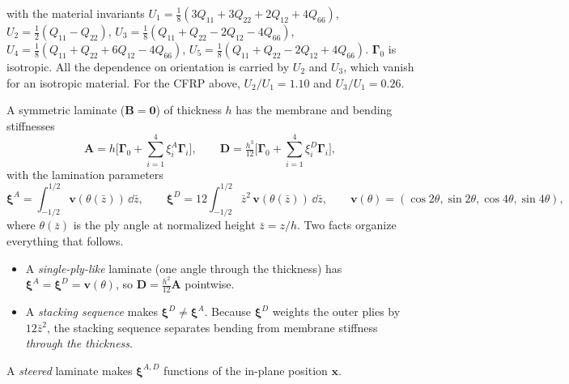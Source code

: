 with the material invariants
$U_1=\tfrac18(3Q_{11}+3Q_{22}+2Q_{12}+4Q_{66})$, $U_2=\tfrac12(Q_{11}-Q_{22})$,
$U_3=\tfrac18(Q_{11}+Q_{22}-2Q_{12}-4Q_{66})$, $U_4=\tfrac18(Q_{11}+Q_{22}+6Q_{12}-4Q_{66})$,
$U_5=\tfrac18(Q_{11}+Q_{22}-2Q_{12}+4Q_{66})$. $\bm\Gamma_0$ is isotropic. All the
dependence on orientation is carried by $U_2$ and $U_3$, which vanish for an isotropic
material. For the CFRP above, $U_2/U_1=1.10$ and $U_3/U_1=0.26$.

A symmetric laminate ($\bm B=\bm 0$) of thickness $h$ has the membrane and bending
stiffnesses
\begin{equation}
\bm A=h\Big[\bm\Gamma_0+\textstyle\sum_{i=1}^4\xi^A_i\bm\Gamma_i\Big],\qquad
\bm D=\tfrac{h^3}{12}\Big[\bm\Gamma_0+\textstyle\sum_{i=1}^4\xi^D_i\bm\Gamma_i\Big],
\label{eq:lampar}
\end{equation}
with the lamination parameters \cite{tsai1968,abdalla2007}
\begin{equation}
\bm\xi^A=\int_{-1/2}^{1/2}\bm v(\theta(\bar z))\,\dd\bar z,\qquad
\bm\xi^D=12\int_{-1/2}^{1/2}\bar z^2\,\bm v(\theta(\bar z))\,\dd\bar z,\qquad
\bm v(\theta)=(\cos2\theta,\sin2\theta,\cos4\theta,\sin4\theta),
\label{eq:xi}
\end{equation}
where $\theta(\bar z)$ is the ply angle at normalized height $\bar z=z/h$. Two facts
organize everything that follows.
\begin{itemize}[itemsep=1pt]
\item A \emph{single-ply-like} laminate (one angle through the thickness) has
$\bm\xi^A=\bm\xi^D=\bm v(\theta)$, so $\bm D=\tfrac{h^2}{12}\bm A$ pointwise.
\item A \emph{stacking sequence} makes $\bm\xi^D\ne\bm\xi^A$. Because $\bm\xi^D$ weights
the outer plies by $12\bar z^2$, the stacking sequence separates bending from membrane
stiffness \emph{through the thickness}.
\end{itemize}
A \emph{steered} laminate makes $\bm\xi^{A,D}$ functions of the in-plane position
$\bm x$.

